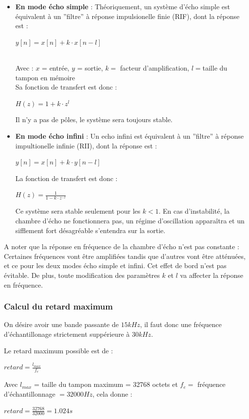 \documentclass{article}
\begin{document}
\begin{itemize}
\item \textbf{En mode écho simple} : Théoriquement, un système d'écho simple est équivalent à un ''filtre'' à réponse impulsionelle finie (RIF), dont la réponse est :
\begin{center}$y[n] = x[n] + k \cdot x[n-l]$ \end{center}\textbf{}\\
Avec : $x$ = entrée, $y$ = sortie, $k = $ facteur d'amplification, $l = $taille du tampon en mémoire\\

Sa fonction de transfert est donc :
\begin{center}$H(z) = 1 + k \cdot z^l$\end{center}

Il n'y a pas de pôles, le système sera toujours stable.

\item \textbf{En mode écho infini} : Un echo infini est équivalent à un ''filtre'' à réponse impultionelle infinie (RII), dont la réponse est :
\begin{center}$y[n] = x[n] + k \cdot y[n-l]$\end{center}

La fonction de transfert est donc :
\begin{center}$H(z) = \frac{1}{1 - k \cdot z^{-l}}$\end{center}
Ce système sera stable seulement pour les $k<1$. En cas d'instabilité, la chambre d'écho ne fonctionnera pas, un régime d'oscillation apparaîtra et un sifflement fort désagréable s'entendra sur la sortie.
\end{itemize}

A noter que la réponse en fréquence de la chambre d'écho n'est pas constante : Certaines fréquences vont être amplifiées tandis que d'autres vont être atténuées, et ce pour les deux modes écho simple et infini. Cet effet de bord n'est pas évitable. De plus, toute modification des paramètres $k$ et $l$ va affecter la réponse en fréquence.

\subsubsection{Calcul du retard maximum}
On désire avoir une bande passante de $15 kHz$, il faut donc une fréquence d'échantillonage strictement suppérieure à $30 kHz$.

Le retard maximum possible est de :
\begin{center}$retard = \frac{l_{max}}{f_e}$\end{center}
Avec $l_{max}$ = taille du tampon maximum = 32768 octets et $f_e = $ fréquence d'échantillonnage $= 32000 Hz$, cela donne :
\begin{center}$retard = \frac{32768}{32000} = 1.024 s$\end{center}
\end{document}
